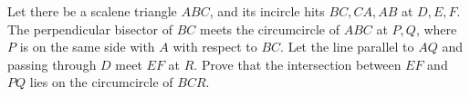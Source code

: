 Let there be a scalene triangle $ABC$, and its incircle hits $BC, CA, AB$ at $D, E, F$. The perpendicular bisector of $BC$ meets the circumcircle of $ABC$ at $P, Q$, where $P$ is on the same side with $A$ with respect to $BC$. Let the line parallel to $AQ$ and passing through $D$ meet $EF$ at $R$. Prove that the intersection between $EF$ and $PQ$ lies on the circumcircle of $BCR$.